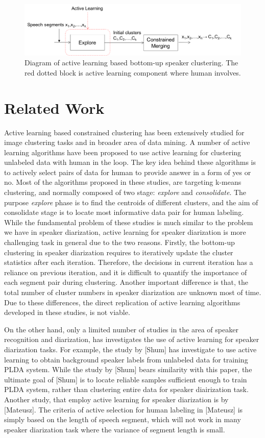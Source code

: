 \documentclass[journal]{IEEEtran}
\begin{document}
\begin{figure}
	\includegraphics[width=\linewidth]{figs/flow5}
	\caption{Diagram of active learning based bottom-up speaker clustering. The red dotted block is active learning component where human involves.}
	\label{fig:flow1}
\end{figure}

\section{Related Work}
\label{rw}
Active learning based constrained clustering has been extensively studied for image clustering tasks and in broader area of data mining. A number of active learning algorithms have been proposed to use active learning for clustering unlabeled data with human in the loop. The key idea behind these algorithms is to actively select pairs of data for human to provide answer in a form of yes or no. 
Most of the algorithms proposed in these studies, are targeting k-means clustering, and normally composed of two stage: \textit{explore} and \textit{consolidate}. The purpose \textit{explore} phase is to find the centroids of different clusters, and the aim of consolidate stage is to locate most informative data pair for human labeling. While the fundamental problem of these studies is much similar to the problem we have in speaker diarization, active learning for speaker diarization is more challenging task in general due to the two reasons. Firstly, the bottom-up clustering in speaker diarization requires to iteratively update the cluster statistics after each iteration. Therefore, the decisions in current iteration has a reliance on previous iteration, and it is difficult to quantify the importance of each segment pair during clustering. Another important difference is that, the total number of cluster numbers in speaker diarization are unknown most of time. Due to these differences, the direct replication of active learning algorithms developed in these studies, is not viable.

On the other hand, only a limited number of studies in the area of speaker recognition and diarization, has investigates the use of active learning for speaker diarization tasks. For example, the study by [Shum] has investigate to use active learning to obtain background speaker labels from unlabeled data for training PLDA system. While the study by [Shum] bears similarity with this paper, the ultimate goal of [Shum] is to locate reliable samples sufficient enough to train PLDA system, rather than clustering entire data for speaker diairization task. Another study, that employ active learning for speaker diarization is by [Mateusz]. The criteria of active selection for human labeling in [Mateusz] is simply based on the length of speech segment, which will not work in many speaker diarization task where the variance of segment length is small.
\end{document}
